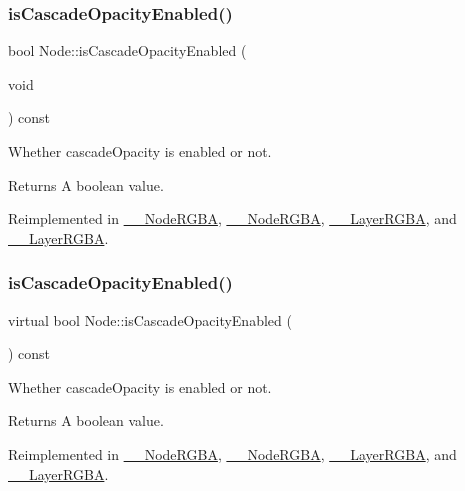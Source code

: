 \subsubsection{\texorpdfstring{is\+Cascade\+Opacity\+Enabled()}{isCascadeOpacityEnabled()}\hspace{0.1cm}{\footnotesize\ttfamily [1/2]}}
{\footnotesize\ttfamily bool Node\+::is\+Cascade\+Opacity\+Enabled (\begin{DoxyParamCaption}\item[{void}]{ }\end{DoxyParamCaption}) const\hspace{0.3cm}{\ttfamily [virtual]}}

Whether cascade\+Opacity is enabled or not. \begin{DoxyReturn}{Returns}
A boolean value. 
\end{DoxyReturn}


Reimplemented in \hyperlink{class____NodeRGBA_a421ef9c26c9860deb23184727d573415}{\+\_\+\+\_\+\+Node\+R\+G\+BA}, \hyperlink{class____NodeRGBA_a421ef9c26c9860deb23184727d573415}{\+\_\+\+\_\+\+Node\+R\+G\+BA}, \hyperlink{class____LayerRGBA_a3dd348cf39ca267d7c0ebb5000dce45e}{\+\_\+\+\_\+\+Layer\+R\+G\+BA}, and \hyperlink{class____LayerRGBA_a3dd348cf39ca267d7c0ebb5000dce45e}{\+\_\+\+\_\+\+Layer\+R\+G\+BA}.

\mbox{\label{classNode_a9d78071b3146583829431d79ffc6ae08}} 
\subsubsection{\texorpdfstring{is\+Cascade\+Opacity\+Enabled()}{isCascadeOpacityEnabled()}\hspace{0.1cm}{\footnotesize\ttfamily [2/2]}}
{\footnotesize\ttfamily virtual bool Node\+::is\+Cascade\+Opacity\+Enabled (\begin{DoxyParamCaption}{ }\end{DoxyParamCaption}) const\hspace{0.3cm}{\ttfamily [virtual]}}

Whether cascade\+Opacity is enabled or not. \begin{DoxyReturn}{Returns}
A boolean value. 
\end{DoxyReturn}


Reimplemented in \hyperlink{class____NodeRGBA_a421ef9c26c9860deb23184727d573415}{\+\_\+\+\_\+\+Node\+R\+G\+BA}, \hyperlink{class____NodeRGBA_a421ef9c26c9860deb23184727d573415}{\+\_\+\+\_\+\+Node\+R\+G\+BA}, \hyperlink{class____LayerRGBA_a3dd348cf39ca267d7c0ebb5000dce45e}{\+\_\+\+\_\+\+Layer\+R\+G\+BA}, and \hyperlink{class____LayerRGBA_a3dd348cf39ca267d7c0ebb5000dce45e}{\+\_\+\+\_\+\+Layer\+R\+G\+BA}.

